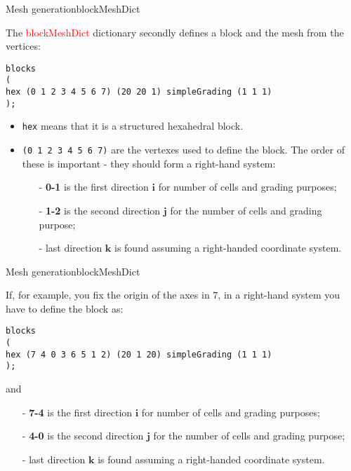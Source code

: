 \documentclass{beamer}
\begin{document}
\begin{frame}[fragile]{Mesh generation}{blockMeshDict}

The \textcolor{red}{blockMeshDict} dictionary secondly defines a block and the mesh from the
vertices:

\begin{verbatim}
blocks
(
hex (0 1 2 3 4 5 6 7) (20 20 1) simpleGrading (1 1 1)
);
\end{verbatim}
\begin{itemize}
\item \texttt{hex} means that it is a structured hexahedral block.
\item \texttt{(0 1 2 3 4 5 6 7)} are the vertexes used to define the block. The order of these
is important - they should form a right-hand system:
\begin{itemize}
\item[-] \textbf{0-1} is the first direction $\mathbf{i}$ for number of cells and grading purposes;
\item[-] \textbf{1-2} is the second direction $\mathbf{j}$ for the number of cells and grading purpose; 
\item[-] last direction $\mathbf{k}$ is found assuming a right-handed coordinate system.
\end{itemize} 

\end{itemize}

\end{frame}

\begin{frame}[fragile]{Mesh generation}{blockMeshDict}

If, for example, you fix the origin of the axes in $7$, in a right-hand system you have to define the block as: 
\begin{verbatim}
blocks
(
hex (7 4 0 3 6 5 1 2) (20 1 20) simpleGrading (1 1 1)
);
\end{verbatim}
and
\begin{itemize}
\item[-] \textbf{7-4} is the first direction $\mathbf{i}$ for number of cells and grading purposes;
\item[-] \textbf{4-0} is the second direction $\mathbf{j}$ for the number of cells and grading purpose; 
\item[-] last direction $\mathbf{k}$ is found assuming a right-handed coordinate system.
\end{itemize} 

 

\end{frame}
\end{document}
